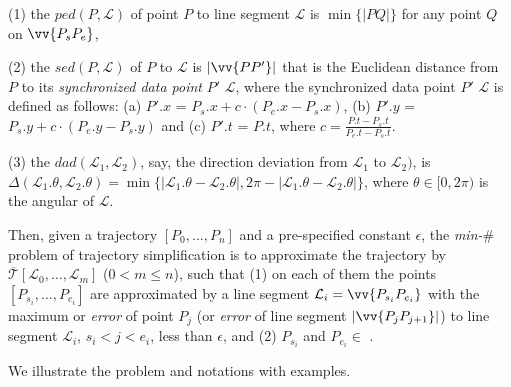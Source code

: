  (1) the $ped(P, \mathcal{L})$ of point $P$ to line segment $\mathcal{L}$ is $\min\{|PQ|\}$ for any point $Q$ on $\vv{P_{s}P_{e}}$,

 (2) the $sed(P, \mathcal{L})$ of $P$ to $\mathcal{L}$ is $|\vv{PP'}|$ that is the Euclidean distance from $P$ to its \textit{synchronized data point} $P'$ \wrt $\mathcal{L}$, where the synchronized data point $P'$ \wrt $\mathcal{L}$ is defined as follows:
(a) $P'.x$ = $P_s.x +  c\cdot(P_e.x - P_s.x)$,
(b) $P'.y$ = $P_s.y +  c\cdot(P_e.y - P_s.y)$ and
(c) $P'.t$ = $P.t$, where $c= \frac{P.t-P_s.t}{P_e.t-P_s.t}$.

 (3) the $dad(\mathcal{L}_1, \mathcal{L}_2)$, say, the direction deviation from $\mathcal{L}_1$ to $\mathcal{L}_2)$, is $\Delta(\mathcal{L}_1.\theta, \mathcal{L}_2.\theta) = \min\{|\mathcal{L}_1.\theta - \mathcal{L}_2.\theta|, 2\pi - |\mathcal{L}_1.\theta - \mathcal{L}_2.\theta|\}$, where $\theta \in [0, 2\pi)$ is the angular of $\mathcal{L}$.



Then, given a trajectory $[P_0, \dots, P_n]$ and a pre-specified constant $\epsilon$, the \emph{min-$\#$} problem of trajectory simplification is to approximate the trajectory  by $\overline{\mathcal{T}}[\mathcal{L}_0, \ldots , \mathcal{L}_m]$ ($0< m \le n$), such that
(1) on each of them the points $[P_{s_i}, \dots, P_{e_i}]$ are approximated by a line segment $\mathcal{L}_i = \vv{P_{s_i}P_{e_i}}$ with the maximum \ped or \sed \emph{error} of point $P_j$ (or \dad \emph{error} of line segment $|\vv{P_jP_{j+1}}|$) to line segment $\mathcal{L}_i$, $s_i < j<e_i$,  less than $\epsilon$, and
(2) $P_{s_i}$ and $P_{e_i} \in$ .



We illustrate the problem and notations with examples.

